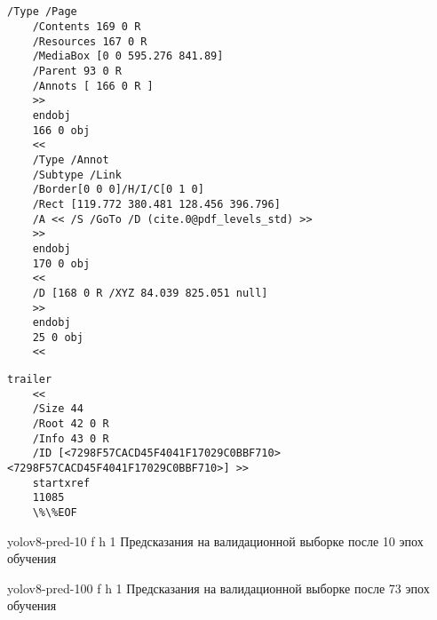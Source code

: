\begin{appendices}
	\chapter{}
\begin{lstlisting}[label=lst:body,caption=Пример части тела PDF файла]
	/Type /Page
	/Contents 169 0 R
	/Resources 167 0 R
	/MediaBox [0 0 595.276 841.89]
	/Parent 93 0 R
	/Annots [ 166 0 R ]
	>>
	endobj
	166 0 obj
	<<
	/Type /Annot
	/Subtype /Link
	/Border[0 0 0]/H/I/C[0 1 0]
	/Rect [119.772 380.481 128.456 396.796]
	/A << /S /GoTo /D (cite.0@pdf_levels_std) >>
	>>
	endobj
	170 0 obj
	<<
	/D [168 0 R /XYZ 84.039 825.051 null]
	>>
	endobj
	25 0 obj
	<<
\end{lstlisting}



\begin{lstlisting}[label=lst:tail,caption=Пример <<хвоста>> PDF файла]
	trailer
	<< 
	/Size 44
	/Root 42 0 R
	/Info 43 0 R
	/ID [<7298F57CACD45F4041F17029C0BBF710> <7298F57CACD45F4041F17029C0BBF710>] >>
	startxref
	11085
	\%\%EOF
\end{lstlisting}

{yolov8-pred-10} %
{f} %
{h} %
{1\textwidth} %
{Предсказания на валидационной выборке после 10 эпох обучения} %


{yolov8-pred-100} %
{f} %
{h} %
{1\textwidth} %
{Предсказания на валидационной выборке после 73 эпох обучения} %


\end{appendices}